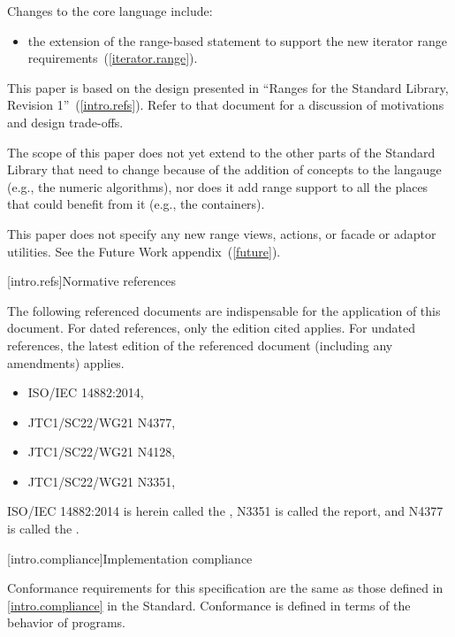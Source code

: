 \pnum
Changes to the core language include:

\begin{itemize}
\item the extension of the range-based  statement to support
the new iterator range requirements~(\ref{iterator.range}).
\end{itemize}

\pnum
This paper is based on the design presented in ``Ranges for the Standard Library,
Revision 1''~(\ref{intro.refs}). Refer to that document for a discussion of
motivations and design trade-offs.

\pnum
The scope of this paper does not yet extend to the other parts of the Standard Library
that need to change because of the addition of concepts to the langauge (e.g., the numeric
algorithms), nor does it add range support to all the places that could benefit from it (e.g.,
the containers).

\pnum
This paper does not specify any new range views, actions, or facade or adaptor
utilities. See the Future Work appendix~(\ref{future}).

[intro.refs]{Normative references}

\pnum
The following referenced documents are indispensable for the
application of this document. For dated references, only the
edition cited applies. For undated references, the latest edition
of the referenced document (including any amendments) applies.

\begin{itemize}
\item ISO/IEC 14882:2014, 
\item JTC1/SC22/WG21 N4377, 
\item JTC1/SC22/WG21 N4128, 
\item JTC1/SC22/WG21 N3351, 
\end{itemize}

ISO/IEC 14882:2014 is herein called the , N3351 is called the
 report, and N4377 is called the .

[intro.compliance]{Implementation compliance}

\pnum
Conformance requirements for this specification are the same as those
defined in \ref{intro.compliance} in the \Cpp Standard.
\enternote
Conformance is defined in terms of the behavior of programs.
\exitnote

